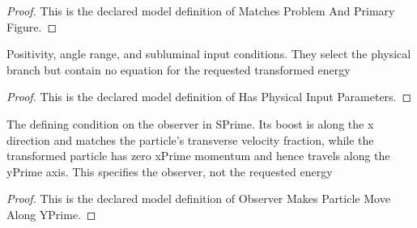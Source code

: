 \begin{proof}
  This is the declared model definition of Matches Problem And Primary Figure.
\end{proof}
\begin{definition}
  \label{def:physics:phyx-mini-0560:phyxminiproblems-problemphyxmini0560-hasphysicalinputparameters}
  Positivity, angle range, and subluminal input conditions. They select the physical branch but contain no equation for the requested transformed energy
\end{definition}
\begin{proof}
  This is the declared model definition of Has Physical Input Parameters.
\end{proof}
\begin{definition}
  \label{def:physics:phyx-mini-0560:phyxminiproblems-problemphyxmini0560-observermakesparticlemovealongyprime}
  The defining condition on the observer in SPrime. Its boost is along the x direction and matches the particle's transverse velocity fraction, while the transformed particle has zero xPrime momentum and hence travels along the yPrime axis. This specifies the observer, not the requested energy
\end{definition}
\begin{proof}
  This is the declared model definition of Observer Makes Particle Move Along YPrime.
\end{proof}
